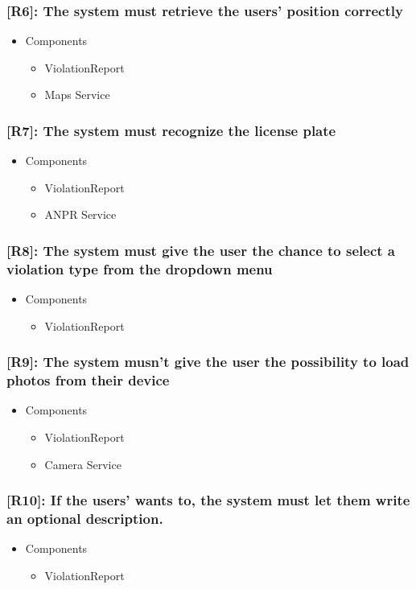 \documentclass[12pt,a4paper]{article}
\begin{document}
\subsubsection*{[R6]: The system must retrieve the users' position correctly}
\begin{itemize}
\item Components
\begin{itemize}
\item ViolationReport
\item Maps Service
\end{itemize}
\end{itemize}
\subsubsection*{[R7]: The system must recognize the license plate}
\begin{itemize}
\item Components
\begin{itemize}
\item ViolationReport
\item ANPR Service
\end{itemize}
\end{itemize}
\subsubsection*{[R8]: The system must give the user the chance to select a violation type from the dropdown menu}
\begin{itemize}
\item Components
\begin{itemize}
\item ViolationReport
\end{itemize}
\end{itemize}
\subsubsection*{[R9]: The system musn't give the user the possibility to load photos from their device}
\begin{itemize}
\item Components
\begin{itemize}
\item ViolationReport
\item Camera Service
\end{itemize}
\end{itemize}
\subsubsection*{[R10]: If the users' wants to, the system must let them write an optional description.}
\begin{itemize}
\item Components
\begin{itemize}
\item ViolationReport
\end{itemize}
\end{itemize}
\end{document}
